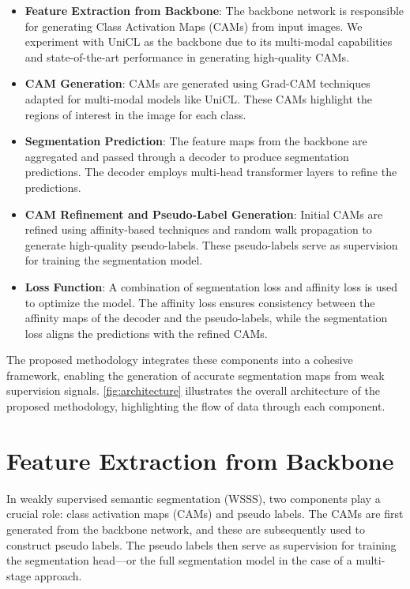 \begin{itemize}
    \item \textbf{Feature Extraction from Backbone}: The backbone network is responsible for generating Class Activation Maps (CAMs) from input images. We experiment with UniCL as the backbone due to its multi-modal capabilities and state-of-the-art performance in generating high-quality CAMs.
    \item \textbf{CAM Generation}: CAMs are generated using Grad-CAM techniques adapted for multi-modal models like UniCL. These CAMs highlight the regions of interest in the image for each class.
    \item \textbf{Segmentation Prediction}: The feature maps from the backbone are aggregated and passed through a decoder to produce segmentation predictions. The decoder employs multi-head transformer layers to refine the predictions.
    \item \textbf{CAM Refinement and Pseudo-Label Generation}: Initial CAMs are refined using affinity-based techniques and random walk propagation to generate high-quality pseudo-labels. These pseudo-labels serve as supervision for training the segmentation model.
    \item \textbf{Loss Function}: A combination of segmentation loss and affinity loss is used to optimize the model. The affinity loss ensures consistency between the affinity maps of the decoder and the pseudo-labels, while the segmentation loss aligns the predictions with the refined CAMs.
\end{itemize}

The proposed methodology integrates these components into a cohesive framework, enabling the generation of accurate segmentation maps from weak supervision signals. \autoref{fig:architecture} illustrates the overall architecture of the proposed methodology, highlighting the flow of data through each component.


\section{Feature Extraction from Backbone}
\label{sec:feature_extraction_from_backbone}

In weakly supervised semantic segmentation (WSSS), two components play a crucial role: class activation maps (CAMs) and pseudo labels. The CAMs are first generated from the backbone network, and these are subsequently used to construct pseudo labels. The pseudo labels then serve as supervision for training the segmentation head—or the full segmentation model in the case of a multi-stage approach. 

